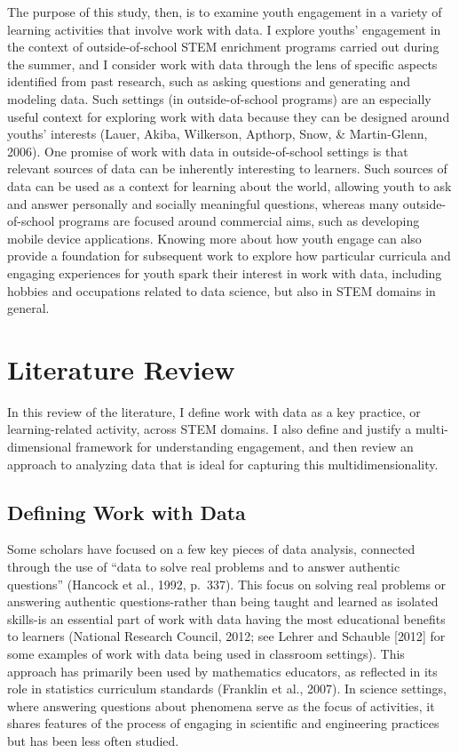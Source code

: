 \documentclass[]{book}
\theoremstyle{definition}
\theoremstyle{definition}
\theoremstyle{definition}
\theoremstyle{remark}
\begin{document}
The purpose of this study, then, is to examine youth engagement in a
variety of learning activities that involve work with data. I explore
youths' engagement in the context of outside-of-school STEM enrichment
programs carried out during the summer, and I consider work with data
through the lens of specific aspects identified from past research, such
as asking questions and generating and modeling data. Such settings (in
outside-of-school programs) are an especially useful context for
exploring work with data because they can be designed around youths'
interests (Lauer, Akiba, Wilkerson, Apthorp, Snow, \& Martin-Glenn,
2006). One promise of work with data in outside-of-school settings is
that relevant sources of data can be inherently interesting to learners.
Such sources of data can be used as a context for learning about the
world, allowing youth to ask and answer personally and socially
meaningful questions, whereas many outside-of-school programs are
focused around commercial aims, such as developing mobile device
applications. Knowing more about how youth engage can also provide a
foundation for subsequent work to explore how particular curricula and
engaging experiences for youth spark their interest in work with data,
including hobbies and occupations related to data science, but also in
STEM domains in general.

\chapter{Literature Review}\label{literature-review}

In this review of the literature, I define work with data as a key
practice, or learning-related activity, across STEM domains. I also
define and justify a multi-dimensional framework for understanding
engagement, and then review an approach to analyzing data that is ideal
for capturing this multidimensionality.

\section{Defining Work with Data}\label{defining-work-with-data}

Some scholars have focused on a few key pieces of data analysis,
connected through the use of ``data to solve real problems and to answer
authentic questions'' (Hancock et al., 1992, p.~337). This focus on
solving real problems or answering authentic questions-rather than being
taught and learned as isolated skills-is an essential part of work with
data having the most educational benefits to learners (National Research
Council, 2012; see Lehrer and Schauble {[}2012{]} for some examples of
work with data being used in classroom settings). This approach has
primarily been used by mathematics educators, as reflected in its role
in statistics curriculum standards (Franklin et al., 2007). In science
settings, where answering questions about phenomena serve as the focus
of activities, it shares features of the process of engaging in
scientific and engineering practices but has been less often studied.
\end{document}
